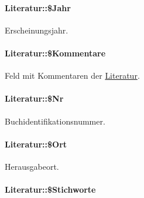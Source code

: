 \hypertarget{classLiteratur_2cb6f40a8757a0edd5da32385ad009c9}{
\paragraph[\$Jahr]{\setlength{\rightskip}{0pt plus 5cm}Literatur::\$Jahr}\hfill}
\label{classLiteratur_2cb6f40a8757a0edd5da32385ad009c9}


Erscheinungsjahr. 

\hypertarget{classLiteratur_ebcaeb5c38ce2677a14189da511fa663}{
\paragraph[\$Kommentare]{\setlength{\rightskip}{0pt plus 5cm}Literatur::\$Kommentare}\hfill}
\label{classLiteratur_ebcaeb5c38ce2677a14189da511fa663}


Feld mit Kommentaren der \hyperlink{classLiteratur}{Literatur}. 

\hypertarget{classLiteratur_036a682a93a5d50839c1ebc70a79d4b6}{
\paragraph[\$Nr]{\setlength{\rightskip}{0pt plus 5cm}Literatur::\$Nr}\hfill}
\label{classLiteratur_036a682a93a5d50839c1ebc70a79d4b6}


Buchidentifikationsnummer. 

\hypertarget{classLiteratur_da6c458bb229187efea8e8f144a1d279}{
\paragraph[\$Ort]{\setlength{\rightskip}{0pt plus 5cm}Literatur::\$Ort}\hfill}
\label{classLiteratur_da6c458bb229187efea8e8f144a1d279}


Herausgabeort. 

\hypertarget{classLiteratur_aa77f0f697d4bcf72279aadedd91ddff}{
\paragraph[\$Stichworte]{\setlength{\rightskip}{0pt plus 5cm}Literatur::\$Stichworte}\hfill}
\label{classLiteratur_aa77f0f697d4bcf72279aadedd91ddff}


